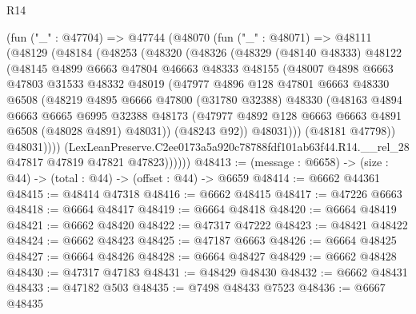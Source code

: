 \begin{lexlean}{R14}
\begin{coremodule}
      (fun ("_" : @47704) =>
      @47744
        (@48070
          (fun ("_" : @48071) =>
          @48111
            (@48129
              (@48184
                (@48253
                  (@48320
                    (@48326
                      (@48329
                        (@48140 @48333)
                        @48122
                        (@48145
                          @4899
                          @6663
                          @47804
                          @46663
                          @48333
                          @48155
                          (@48007
                            @4898
                            @6663
                            @47803
                            @31533
                            @48332
                            @48019
                            (@47977
                              @4896
                              @128
                              @47801
                              @6663
                              @48330
                              @6508
                              (@48219
                                @4895
                                @6666
                                @47800
                                (@31780 @32388)
                                @48330
                                (@48163
                                  @4894
                                  @6663
                                  @6665
                                  @6995
                                  @32388
                                  @48173
                                  (@47977 @4892 @128 @6663 @6663 @4891 @6508 (@48028 @4891) @48031))
                                (@48243 @92))
                              @48031)))
                        (@48181 @47798))
                      @48031))))
              (LexLeanPreserve.C2ee0173a5a920c78788fdf101ab63f44.R14.__rel_28
                @47817
                @47819
                @47821
                @47823))))))
@48413 := (message : @6658) -> (size : @44) -> (total : @44) -> (offset : @44) -> @6659
@48414 := @6662 @44361
@48415 := @48414 @47318
@48416 := @6662 @48415
@48417 := @47226 @6663
@48418 := @6664 @48417
@48419 := @6664 @48418
@48420 := @6664 @48419
@48421 := @6662 @48420
@48422 := @47317 @47222
@48423 := @48421 @48422
@48424 := @6662 @48423
@48425 := @47187 @6663
@48426 := @6664 @48425
@48427 := @6664 @48426
@48428 := @6664 @48427
@48429 := @6662 @48428
@48430 := @47317 @47183
@48431 := @48429 @48430
@48432 := @6662 @48431
@48433 := @47182 @503
@48435 := @7498 @48433 @7523
@48436 := @6667 @48435

\end{coremodule}
\end{lexlean}
